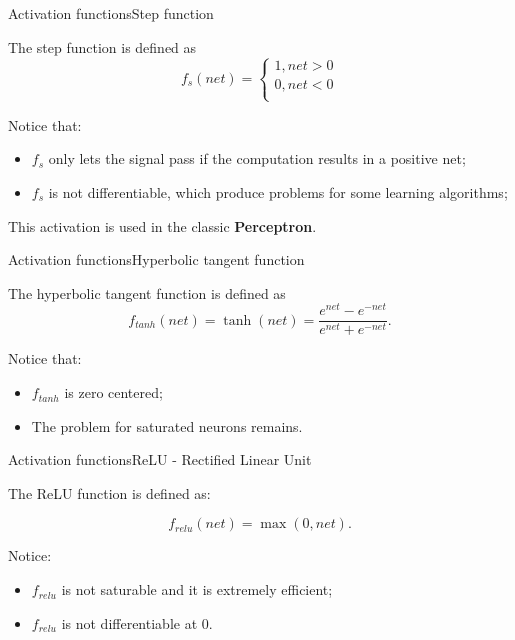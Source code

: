 \documentclass{beamer}
\begin{document}
        \begin{frame}{Activation functions}{Step function}

            The step function is defined as
            \begin{displaymath}
                f_s(net) = 
                \begin{cases}
                    1, net > 0\\
                    0, net < 0\\
                \end{cases}
            \end{displaymath}

            Notice that:
            \begin{itemize}
                \item $f_s$ only lets the signal pass if the computation results in a positive net;
                \item $f_s$ is not differentiable, which produce problems for some learning algorithms; 
            \end{itemize}

            This activation is used in the classic \textbf{Perceptron}.

        \end{frame}


        \begin{frame}{Activation functions}{Hyperbolic tangent function}

            The hyperbolic tangent function is defined as
            \begin{displaymath}
                f_{tanh}(net) = \tanh(net) = \frac{e^{net} - e^{-net}}{e^{net} + e^{-net}}.
            \end{displaymath}

            Notice that:
            \begin{itemize}
                \item $f_{tanh}$ is zero centered;
                \item The problem for saturated neurons remains.
            \end{itemize}

        \end{frame}

        \begin{frame}{Activation functions}{ReLU - Rectified Linear Unit}

            The ReLU function is defined as:

            \begin{displaymath}
                f_{relu}(net) = \max(0, net).
            \end{displaymath}

            Notice:
            \begin{itemize}
                \item $f_{relu}$ is not saturable and it is extremely efficient;
                \item $f_{relu}$ is not differentiable at $0$.
            \end{itemize}

        \end{frame}
\end{document}
